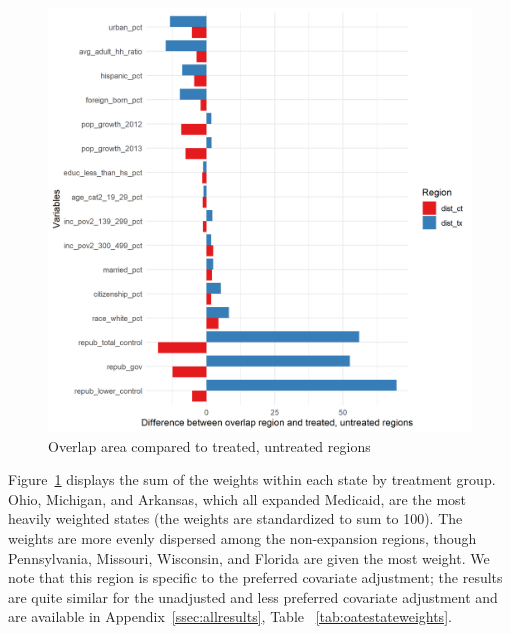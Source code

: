 \documentclass[12pt]{article}
\begin{document}
\begin{figure}[]
\begin{center}
    \includegraphics[scale=0.6]{01_Plots/oate-imbalances.png}
    \caption{Overlap area compared to treated, untreated regions}
    \label{fig:oateimbalance}
\end{center}
\end{figure}

Figure~\ref{fig:oateimbalance} displays the sum of the weights within each state by treatment group. Ohio, Michigan, and Arkansas, which all expanded Medicaid, are the most heavily weighted states (the weights are standardized to sum to 100). The weights are more evenly dispersed among the non-expansion regions, though Pennsylvania, Missouri, Wisconsin, and Florida are given the most weight. We note that this region is specific to the preferred covariate adjustment; the results are quite similar for the unadjusted and less preferred covariate adjustment and are available in Appendix~\ref{ssec:allresults}, Table ~\ref{tab:oatestateweights}.
\end{document}

